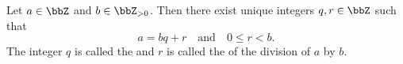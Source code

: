 \begin{theorem} \label{theorem:division_algorithm_for_integers_euclidean_algorithm_for_integers}
Let $a \in \bbZ$ and $b \in \bbZ_{> 0}$. Then there exist unique integers $q, r \in \bbZ$ such that
$$ a = bq + r \quad \text{and} \quad 0 \le r < b. $$
The integer $q$ is called the  and $r$ is called the  of the division of $a$ by $b$.
\end{theorem}